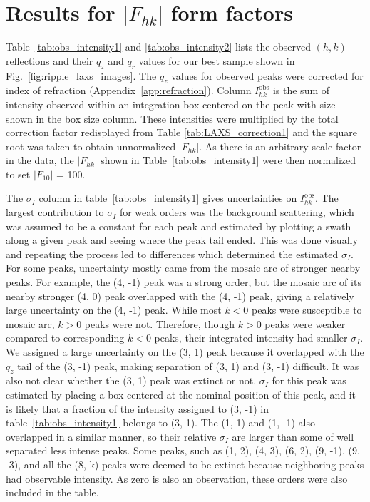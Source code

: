 \newpage
\section{Results for $|F_{hk}|$ form factors}\label{sec:LAXS_form_factors}

Table~\ref{tab:obs_intensity1} and \ref{tab:obs_intensity2} lists the observed 
$(h,k)$ reflections and their $q_z$ and $q_r$ values for our best sample shown 
in Fig.~\ref{fig:ripple_laxs_images}. The $q_z$ values 
for observed peaks were corrected for index of refraction (Appendix~\ref{app:refraction}).
Column $I^\text{obs}_{hk}$ is the sum of intensity observed within an
integration box centered on the peak with size shown in the box size column.  
These intensities were multiplied by the total correction factor redisplayed 
from Table \ref{tab:LAXS_correction1} and the square root was taken to obtain 
unnormalized  $|F_{hk}|$.  
As there is an arbitrary scale factor in the data, the $|F_{hk}|$ shown in 
Table~\ref{tab:obs_intensity1} were then normalized to set $|F_{10}|$ = 100.

The $\sigma_I$ column in table~\ref{tab:obs_intensity1} gives uncertainties on 
$I^\text{obs}_{hk}$.
The largest contribution to $\sigma_I$ for weak orders was the background 
scattering, which
was assumed to be a constant for each peak and 
estimated by plotting a swath along a given peak 
and seeing where the peak tail ended. This was done visually and repeating 
the process led to differences which determined the estimated $\sigma_I$.  
For some peaks, uncertainty mostly came 
from the mosaic arc of stronger nearby peaks. For example, the (4, -1) peak was a
strong order, but the mosaic arc of its nearby stronger (4, 0) peak  
overlapped with the (4, -1) peak, giving a relatively large uncertainty
on the (4, -1) peak. While most $k<0$ peaks were susceptible to
mosaic arc, $k > 0$ peaks were not. Therefore, though $k> 0$ peaks were weaker
compared to corresponding $k < 0$ peaks, their integrated intensity
had smaller $\sigma_I$. We assigned a large uncertainty on the (3, 1) peak because
it overlapped with the $q_z$ tail of the (3, -1) peak, making separation of 
(3, 1) and (3, -1) difficult. It was also not clear whether the (3, 1) peak
was extinct or not. $\sigma_I$ for this peak was estimated by placing a
box centered at the nominal position of this peak, and it is likely that a fraction
of the intensity assigned to (3, -1) in table~\ref{tab:obs_intensity1} belongs to (3, 1).
The (1, 1) and (1, -1) also overlapped in a similar manner, so their
relative $\sigma_I$ are larger than some of well separated less intense peaks.  
Some peaks, such as (1, 2), (4, 3), (6, 2), (9, -1), (9, -3), and all the 
(8, k) peaks were deemed to be extinct because neighboring peaks had 
observable intensity. As zero is also an observation, these orders were also 
included in the table. 

